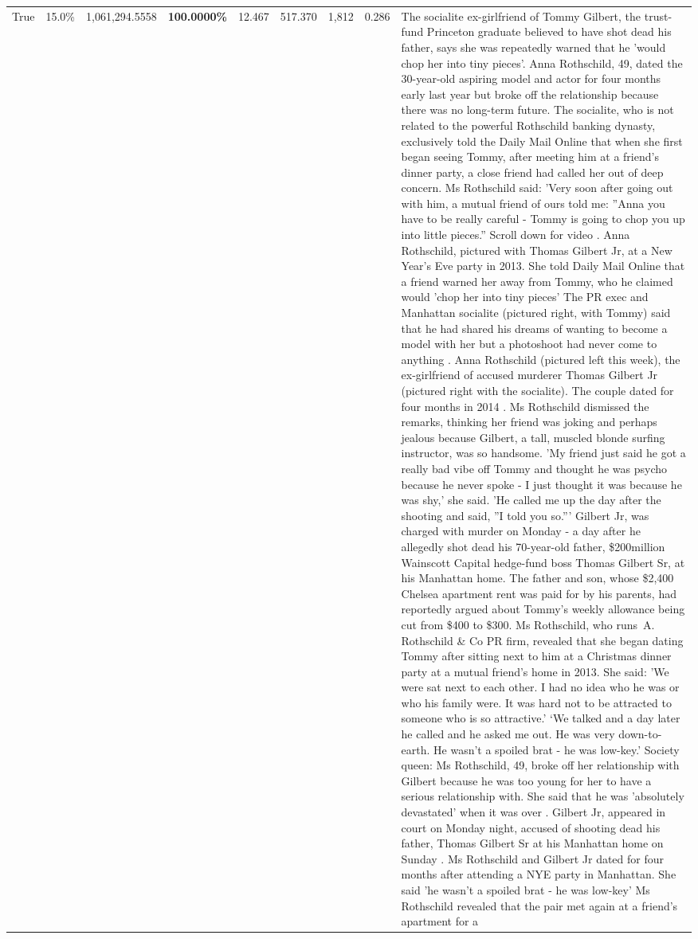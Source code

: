 \begin{table}[H]
\begin{tabular}{lllrlllll}
True & 15.0\% & 1,061,294.5558 & \bfseries \color{red} 100.0000\% & 12.467 & 517.370 & 1,812 & 0.286 & The socialite ex-girlfriend of Tommy Gilbert, the trust-fund Princeton graduate believed to have shot dead his father, says she was repeatedly warned that he 'would chop her into tiny pieces'. Anna Rothschild, 49, dated the 30-year-old aspiring model and actor for four months early last year but broke off the relationship because there was no long-term future. The socialite, who is not related to the powerful Rothschild banking dynasty, exclusively told the Daily Mail Online that when she first began seeing Tommy, after meeting him at a friend's dinner party, a close friend had called her out of deep concern. Ms Rothschild said: 'Very soon after going out with him, a mutual friend of ours told me: ''Anna you have to be really careful - Tommy is going to chop you up into little pieces.'' Scroll down for video . Anna Rothschild, pictured with Thomas Gilbert Jr, at a New Year's Eve party in 2013. She told Daily Mail Online that a friend warned her away from Tommy, who he claimed would 'chop her into tiny pieces' The PR exec and Manhattan socialite (pictured right, with Tommy) said that he had shared his dreams of wanting to become a model with her but a photoshoot had never come to anything . Anna Rothschild (pictured left this week), the ex-girlfriend of accused murderer Thomas Gilbert Jr (pictured right with the socialite). The couple dated for four months in 2014 . Ms Rothschild dismissed the remarks, thinking her friend was joking and perhaps jealous because Gilbert, a tall, muscled blonde surfing instructor, was so handsome. 'My friend just said he got a really bad vibe off Tommy and thought he was psycho because he never spoke - I just thought it was because he was shy,' she said. 'He called me up the day after the shooting and said, ''I told you so.''' Gilbert Jr, was charged with murder on Monday - a day after he allegedly shot dead his 70-year-old father, \$200million Wainscott Capital hedge-fund boss Thomas Gilbert Sr, at his Manhattan home. The father and son, whose \$2,400 Chelsea apartment rent was paid for by his parents, had reportedly argued about Tommy's weekly allowance being cut from \$400 to \$300. Ms Rothschild, who runs A. Rothschild \& Co PR firm, revealed that she began dating Tommy after sitting next to him at a Christmas dinner party at a mutual friend's home in 2013. She said: 'We were sat next to each other. I had no idea who he was or who his family were. It was hard not to be attracted to someone who is so attractive.' ‘We talked and a day later he called and he asked me out. He was very down-to-earth. He wasn’t a spoiled brat - he was low-key.’ Society queen: Ms Rothschild, 49, broke off her relationship with Gilbert because he was too young for her to have a serious relationship with. She said that he was 'absolutely devastated' when it was over . Gilbert Jr, appeared in court on Monday night, accused of shooting dead his father, Thomas Gilbert Sr at his Manhattan home on Sunday . Ms Rothschild and Gilbert Jr dated for four months after attending a NYE party in Manhattan. She said 'he wasn't a spoiled brat - he was low-key' Ms Rothschild revealed that the pair met again at a friend’s apartment for a 
\end{tabular}
\end{table}
